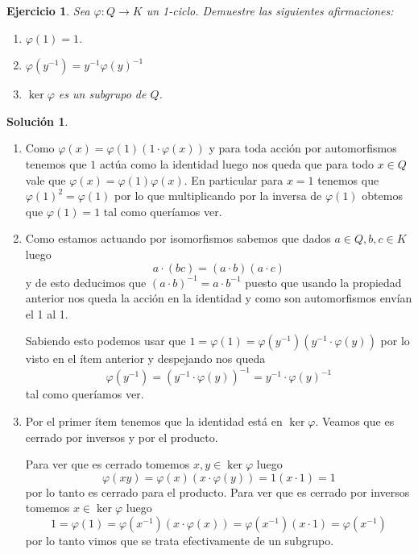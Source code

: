\documentclass[11pt]{article}
\theoremstyle{plain}
\newtheorem*{ej}{Ejercicio}
\theoremstyle{definition}
\newtheorem*{sol}{Solución}
\theoremstyle{remark}
\begin{document}
\bigskip
\begin{tcolorbox}[colback=teal!25!white,colframe=teal!75!black]
	\begin{ej}
		Sea $\varphi:Q \to K$ un 1-ciclo. Demuestre las siguientes afirmaciones:
		\begin{enumerate}
			\item $\varphi(1)=1$.
			\item $\varphi(y^{-1}) = y^{-1}\varphi(y)^{-1}$
			\item $\ker \varphi$ es un subgrupo de $Q$.
		\end{enumerate}
	\end{ej}	
\end{tcolorbox}
\medskip
\begin{sol}
	\begin{enumerate}
		\item Como $\varphi(x)=\varphi(1)(1 \cdot \varphi(x))$ y para toda acción por automorfismos tenemos que $1$ actúa como la identidad luego nos queda que para todo $x \in Q$ vale que $\varphi(x)=\varphi(1)\varphi(x)$. En particular para $x =1$ tenemos que $\varphi(1)^2=\varphi(1)$ por lo que multiplicando por la inversa de $\varphi(1)$ obtemos que $\varphi(1)=1$ tal como queríamos ver.
		\item Como estamos actuando por isomorfismos sabemos que dados $a \in Q, b,c \in K$ luego
		\begin{equation*}
			a \cdot (bc) = (a \cdot b)(a \cdot c)
		\end{equation*}
		y de esto deducimos que $(a \cdot b)^{-1} = a \cdot b^{-1}$ puesto que usando la propiedad anterior nos queda la acción en la identidad y como son automorfismos envían el 1 al 1. 
		
		Sabiendo esto podemos usar que $1=\varphi(1) = \varphi(y^{-1})(y^{-1} \cdot \varphi(y))$ por lo visto en el ítem anterior y despejando nos queda
		\[
		\varphi(y^{-1}) = (y^{-1} \cdot \varphi(y))^{-1} = y^{-1} \cdot \varphi(y)^{-1}
		\]
		tal como queríamos ver.
		\item Por el primer ítem tenemos que la identidad está en $\ker \varphi$. Veamos que es cerrado por inversos y por el producto.
		
		Para ver que es cerrado tomemos $x,y \in \ker \varphi$ luego
		\[
		\varphi(xy) = \varphi(x) (x \cdot \varphi(y)) = 1 (x \cdot 1) = 1
		\]
		por lo tanto es cerrado para el producto. Para ver que es cerrado por inversos tomemos $x \in \ker \varphi$ luego
		\[
		1=\varphi(1) = \varphi(x^{-1}) (x \cdot \varphi(x)) = \varphi(x^{-1}) (x \cdot 1) = \varphi(x^{-1})
		\]
		por lo tanto vimos que se trata efectivamente de un subgrupo.
	\end{enumerate}
\end{sol}
\end{document}
